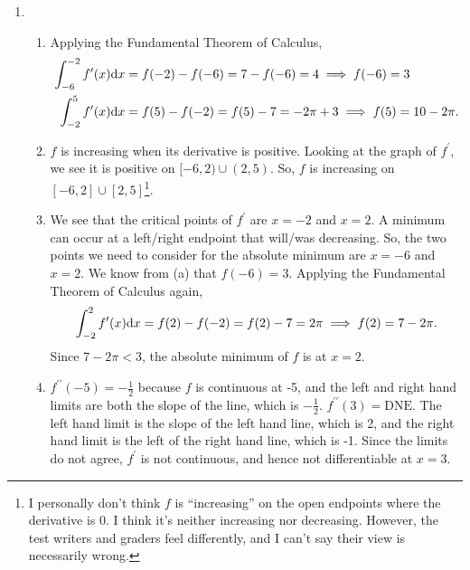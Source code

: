 \begin{enumerate}
	\item \begin{enumerate}
		\item Applying the Fundamental Theorem of Calculus,
			\begin{align*}
				\int_{-6}^{-2}{f^\prime(x)\mathrm{d} x} &= f(-2) - f(-6) = 7 - f(-6) = 4 \implies f(-6) = 3 \\
				\int_{-2}^{5}{f^\prime(x)\mathrm{d} x} &= f(5) - f(-2) = f(5) - 7 = -2\pi + 3 \implies f(5) = 10 - 2\pi.
			\end{align*}
		\item $f$ is increasing when its derivative is positive.
			Looking at the graph of $f^\prime$, we see it is positive on $[-6,2) \cup (2,5)$.
			So, $f$ is increasing on $[-6,2] \cup [2,5]$\footnote{I personally don't think $f$ is ``increasing'' on the open endpoints where the derivative is 0. I think it's neither increasing nor decreasing. However, the test writers and graders feel differently, and I can't say their view is necessarily wrong.}.
		\item We see that the critical points of $f^\prime$ are $x=-2$ and $x=2$.
			A minimum can occur at a left/right endpoint that will/was decreasing.
			So, the two points we need to consider for the absolute minimum are $x=-6$ and $x=2$.
			We know from (a) that $f(-6)=3$.
			Applying the Fundamental Theorem of Calculus again,
			\begin{equation*}
				\int_{-2}^{2}{f^\prime(x)\mathrm{d} x} = f(2) - f(-2) = f(2) - 7 = 2\pi \implies f(2) = 7-2\pi.
			\end{equation*}
			Since  $7-2\pi < 3$, the absolute minimum of $f$ is at $x=2$.
		\item $f^{\prime\prime}(-5) = -\frac{1}{2}$ because $f$ is continuous at -5, and the left and right hand limits are both the slope of the line, which is $-\frac{1}{2}$.
			$f^{\prime\prime}(3) = \text{DNE}$.
			The left hand limit is the slope of the left hand line, which is 2, and the right hand limit is the left of the right hand line, which is -1.
			Since the limits do not agree, $f^\prime$ is not continuous, and hence not differentiable at $x=3$.
	\end{enumerate}


\end{enumerate}
